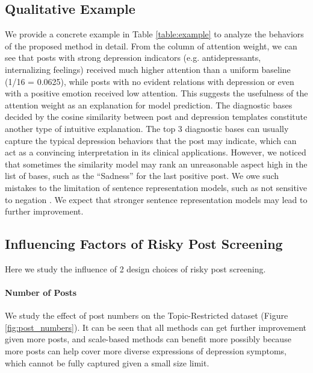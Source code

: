 \subsection{Qualitative Example}


We provide a concrete example in Table \ref{table:example} to analyze the behaviors of the proposed method in detail. From the column of attention weight, we can see that posts with strong depression indicators (e.g. antidepressants, internalizing feelings) received much higher attention than a uniform baseline (1/16 = 0.0625), while posts with no evident relations with depression or even with a positive emotion received low attention. This suggests the usefulness of the attention weight as an explanation for model prediction. The diagnostic bases decided by the cosine similarity between post and depression templates constitute another type of intuitive explanation. The top 3 diagnostic bases can usually capture the typical depression behaviors that the post may indicate, which can act as a convincing interpretation in its clinical applications. However, we noticed that sometimes the similarity model may rank an unreasonable aspect high in the list of bases, such as the ``Sadness'' for the last positive post. We owe such mistakes to the limitation of sentence representation models, such as not sensitive to negation \citep{ribeiro2020beyond}. We expect that stronger sentence representation models may lead to further improvement.

\subsection{Influencing Factors of Risky Post Screening}

Here we study the influence of 2 design choices of risky post screening.

\paragraph{Number of Posts} 
We study the effect of post numbers on the Topic-Restricted dataset (Figure \ref{fig:post_numbers}). It can be seen that all methods can get further improvement given more posts, and scale-based methods can benefit more possibly because more posts can help cover more diverse expressions of depression symptoms, which cannot be fully captured given a small size limit.


